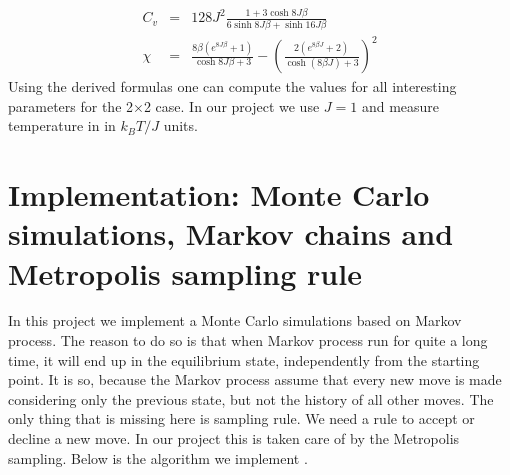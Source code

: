 \documentclass[a4paper]{article}
\begin{document}
\begin{eqnarray}
C_{v} &=&128J^{2}\frac{1+3\cosh 8J\beta }{6\sinh 8J\beta +\sinh 16J\beta }\\
\chi &=&\frac{8\beta (e^{8J\beta }+1)}{\cosh 8J\beta +3}-\left( \frac{2(e^{8\beta J}+2)}{\cosh (8\beta J)+3}\right) ^{2}
\end{eqnarray}
Using the derived formulas one can compute the values for all interesting parameters for the 2$\times$2 case. In our project we use $J=1$ and measure temperature in in $k_BT/J$ units.

\clearpage
\section{Implementation: Monte Carlo simulations, Markov chains and Metropolis sampling rule}\label{Implementation}
In this project we implement a Monte Carlo simulations based on Markov process. The reason to do so is that when Markov process run for quite a long time, it will end up in the equilibrium state, independently from the starting point. It is so, because the Markov process assume that every new move is made considering only the previous state, but not the history of all other moves. The only thing that is missing here is sampling rule. We need a rule to accept or decline a new move. In our project this is taken care of by the Metropolis sampling. Below is the algorithm we implement \cite{two}. 
\end{document}
